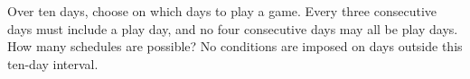 Over ten days, choose on which days to play a game. Every three consecutive days must include a play day, and no four consecutive days may all be play days. How many schedules are possible? No conditions are imposed on days outside this ten-day interval.
